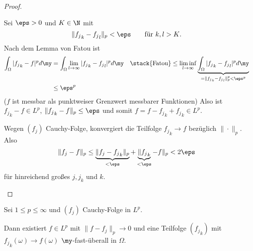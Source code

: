 \documentclass{mycourse}
\begin{document}
\begin{st}
\begin{proof}
\begin{seg}[$1 \le p < \infty$]
\begin{enumerate}[a)]
					Sei $\eps > 0$ und $K \in \N$ mit
					\[
						\|{f_j}_k - {f_j}_l \|_p < \eps  \qquad \text{für $k,l > K$.}
					\]
					Nach dem Lemma von Fatou ist
					\begin{align*}
						\int_{\Omega} |{f_j}_k - f|^p d\my
						&= \int_{\Omega} \lim_{l\to \infty} |{f_j}_k - {f_j}_l |^p d\my
						&\stack{\text{Fatou}}\le \liminf_{l\to \infty} \underbrace{\int_{\Omega} |{f_j}_k - {f_j}_l |^p d\my}_{= \|{f_j}_k - {f_j}_l\|_p^p < \eps^p} \\
						&\le \eps^p
					\end{align*}
					($f$ ist messbar als punktweiser Grenzwert messbarer Funktionen)
					Also ist ${f_j}_k - f \in L^p$, $\|{f_j}_k - f\|_p \le \eps$ und somit $f = f - {f_j}_k + {f_j}_k \in L^p$.

					Wegen $(f_j)$ Cauchy-Folge, konvergiert die Teilfolge ${f_j}_k \to f$ bezüglich $\|\cdot\|_p$.
					Also
					\[
						\|f_j - f\|_p 
						\le \underbrace{\|f_j - {f_j}_k \|_p}_{< \eps} + \underbrace{\|{f_j}_k}_{< \eps} - f\|_p 
						< 2 \eps
					\]
					für hinreichend großes $j, j_k$ und $k$.
			\end{enumerate}
		\end{seg}
	\end{proof}
\end{st}

\begin{kor}[Wegl] \label{2.14}
	Sei $1 \le p \le \infty$ und $(f_j)$ Cauchy-Folge in $L^p$.
	
	Dann existiert $f \in L^p$ mit $\|f - f_j\|_p \to 0$ und eine Teilfolge $({f_j}_k)$ mit ${f_j}_k(\omega) \to f(\omega)$ $\my$-fast-überall in $\Omega$.
\end{kor}
\end{document}
